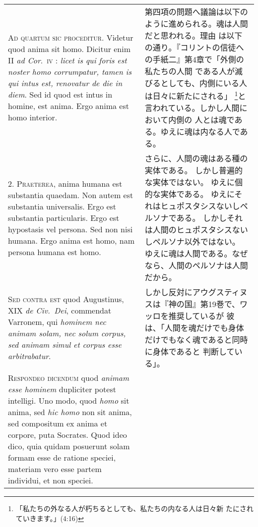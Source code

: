 \documentclass[paper=a4paper,fontsize=10pt,jafontsize=9pt,titlepage]{jlreq}
\begin{document}
\begin{longtable}{p{21em}p{21em}}
{\scshape Ad quartum sic proceditur}. Videtur quod anima sit homo. Dicitur enim
II {\itshape ad Cor}.~{\scshape iv} : {\itshape licet is qui foris est noster homo corrumpatur, tamen
is qui intus est, renovatur de die in diem}. Sed id quod est intus in
homine, est anima. Ergo anima est homo interior.


&

第四項の問題へ議論は以下のように進められる。魂は人間だと思われる。理由
は以下の通り。『コリントの信徒への手紙二』第4章で「外側の私たちの人間
である人が滅びるとしても、内側にいる人は日々に新たにされる」
\footnote{「私たちの外なる人が朽ちるとしても、私たちの内なる人は日々新
たにされていきます。」(4:16)}と言われている。しかし人間において内側の
人とは魂である。ゆえに魂は内なる人である。

\\




2. {\scshape Praeterea}, anima humana est substantia quaedam. Non autem est
 substantia universalis. Ergo est substantia particularis. Ergo est
 hypostasis vel persona. Sed non nisi humana. Ergo anima est homo, nam
 persona humana est homo.


&

さらに、人間の魂はある種の実体である。
しかし普遍的な実体ではない。
ゆえに個的な実体である。
ゆえにそれはヒュポスタシスないしペルソナである。
しかしそれは人間のヒュポスタシスないしペルソナ以外ではない。
ゆえに魂は人間である。なぜなら、人間のペルソナは人間だから。

\\




{\scshape Sed contra est} quod Augustinus, XIX {\itshape de Civ.~Dei}, commendat Varronem,
 qui {\itshape hominem nec animam solam, nec solum corpus, sed animam simul et
 corpus esse arbitrabatur}.


&

しかし反対にアウグスティヌスは『神の国』第19巻で、ワッロを推奨しているが
 彼は、「人間を魂だけでも身体だけでもなく魂であると同時に身体であると
 判断している」。

\\




{\scshape Respondeo dicendum} quod {\itshape animam esse hominem}
dupliciter potest intelligi. Uno modo, quod {\itshape homo} sit anima,
sed {\itshape hic homo} non sit anima, sed compositum ex anima et
corpore, puta Socrates. Quod ideo dico, quia quidam posuerunt solam
formam esse de ratione speciei, materiam vero esse partem individui,
et non speciei.


\end{longtable}
\end{document}

